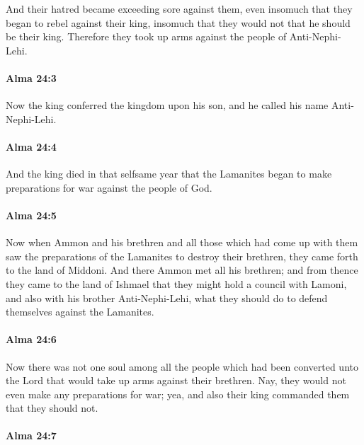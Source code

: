 			And their hatred became exceeding sore against them,
			even insomuch that they began to rebel against their king,
			insomuch that they would not that he should be their king.
			Therefore they took up arms against the people of Anti-Nephi-Lehi.

		\paragraph{Alma 24:3} %
			\label{ALMA-24-3}

			Now the king conferred the kingdom upon his son,
			and he called his name Anti-Nephi-Lehi.

		\paragraph{Alma 24:4} %
			\label{ALMA-24-4}

			And the king died in that selfsame year
			that the Lamanites began to make preparations for war against the people of God.

		\paragraph{Alma 24:5} %
			\label{ALMA-24-5}

			Now when Ammon and his brethren and all those which had come up with them
			saw the preparations of the Lamanites to destroy their brethren,
			they came forth to the land of Middoni.
			And there Ammon met all his brethren;
			and from thence they came to the land of Ishmael
			that they might hold a council with Lamoni,
			and also with his brother Anti-Nephi-Lehi,
			what they should do to defend themselves against the Lamanites.

		\paragraph{Alma 24:6} %
			\label{ALMA-24-6}

			Now there was not one soul among all the people
			which had been converted unto the Lord
			that would take up arms against their brethren.
			Nay, they would not even make any preparations for war;
			yea, and also their king commanded them that they should not.

		\paragraph{Alma 24:7} %
			\label{ALMA-24-7}

